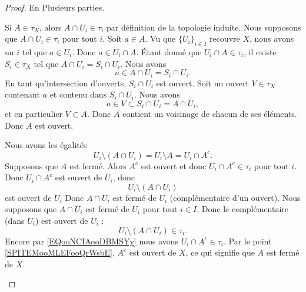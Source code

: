 \begin{proof}
	En Plusieurs parties.
	\begin{subproof}
		Si \( A\in \tau_X\), alors \( A\cap U_i\in \tau_i\) par définition de la topologie induite.
				\label{SPITEMooMLEFooQrWsbE}
		Nous supposons que \( A\cap U_i\in \tau_i\) pour tout \( i\). Soit \( a\in A\). Vu que \( \{ U_i \}_{i\in I}\) recouvre \( X\), nous avons un \( i\) tel que \( a\in U_i\). Donc \( a\in U_i\cap A\). Étant donné que \( U_i\cap A\in \tau_i\), il existe \( S_i\in \tau_X\) tel que \( A\cap U_i=S_i\cap U_i\). Nous avons
		\begin{equation}
			a\in A\cap U_i= S_i\cap U_i.
		\end{equation}
		En tant qu'intersection d'ouverts, \( S_i\cap U_i\) est ouvert. Soit un ouvert \( V\in\tau_X\) contenant \( a\) et contenu dans \( S_i\cap U_i\). Nous avons
		\begin{equation}
			a\in V\subset S_i\cap U_i=A\cap U_i,
		\end{equation}
		et en particulier \( V\subset A\). Donc \( A\) contient un voisinage de chacun de ses éléments. Donc \( A\) est ouvert.

		Nous avons les égalités
		\begin{equation}		\label{EQooNCIAooDBMSYy}
			U_i\setminus(A\cap U_i)=U_i\setminus A=U_i\cap A^c.
		\end{equation}
		Supposons que \( A\) est fermé. Alors \( A^c\) est ouvert et donc \( U_i\cap A^c\in\tau_i\) pour tout \( i\). Donc \( U_i\cap A^c\) est ouvert de \( U_i\), donc
		\begin{equation}
			U_i\setminus(A\cap U_i)
		\end{equation}
		est ouvert de \( U_i\) Donc \( A\cap U_i\) est fermé de \( U_i\) (complémentaire d'un ouvert).
		Nous supposons que \( A\cap U_i\) est fermé de \( U_i\) pour tout \( i\in I\). Donc le complémentaire (dans \( U_i\)) est ouvert de \( U_i\) :
		\begin{equation}
			U_i\setminus(A\cap U_i)\in \tau_i.
		\end{equation}
		Encore par \eqref{EQooNCIAooDBMSYy} nous avons \( U_i\cap A^c\in\tau_i\). Par le point \ref{SPITEMooMLEFooQrWsbE}, \( A^c\) est ouvert de \( X\), ce qui signifie que \( A\) est fermé de \( X\).
	\end{subproof}
\end{proof}


